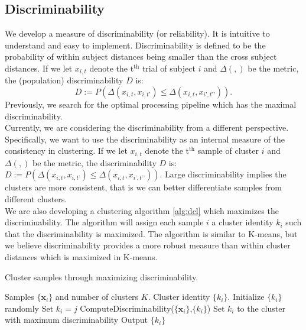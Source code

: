 \documentclass[simplex.tex]{subfiles}
\providecommand{\mb}[1]{\boldsymbol{#1}}
\newcommand{\bx}{\mb{x}}
\begin{document}
\subsection{Discriminability}
We develop a measure of discriminability (or reliability).  It
is intuitive to understand and easy to implement.
Discriminability is defined to be the probability of within
subject distances being smaller than the cross subject
distances. If we let $x_{i,t}$ denote the t$^{\text{th}}$ trial of subject 
$i$ and $\Delta(,)$ be the metric, the (population) discriminability $D$
is: 
\[D:= P (\Delta(x_{i,t} , x_{i,t’}) \leq  \Delta(x_{i,t} , x_{i’,t’’})).\]
Previously, we search for the optimal processing pipeline which has the
maximal discriminability. 
\\
Currently, we are considering the discriminability from a different perspective. Specifically, we want to use the discriminability as an internal measure of the consistency in clustering. If we let $x_{i,t}$ denote the t$^{\text{th}}$ sample of cluster 
$i$ and $\Delta(,)$ be the metric, the discriminability $D$
is: $D:= P (\Delta(x_{i,t} , x_{i,t’}) \leq  \Delta(x_{i,t} , x_{i’,t’’}))$. Large discriminability implies the clusters are more consistent, that is we can better differentiate samples from different clusters. 
\\
We are also developing a clustering algorithm \ref{alg:dcl} which maximizes the discriminability. The algorithm will assign each sample $i$ a cluster identity $k_i$ such that the discriminability is maximized. The algorithm is similar to K-means, but we believe discriminability provides a more robust measure than within cluster distances which is maximized in K-means.
\begin{algorithm}               
	\caption{Cluster samples through maximizing discriminability.  }   
	\label{alg:dcl}                       
	\begin{algorithmic}                    
		\Require Samples $\{\bx_{i}\}$ and number of clusters $K$.
		\Ensure Cluster identity $\{k_{i}\}$. 
		\State Initialize $\{k_{i}\}$ randomly
		\State Set $k_{i} = j$ 
		\State ComputeDiscriminability($\{\bx_{i}\}$,$\{k_{i}\}$)
		\EndFor
		\State Set $k_{i}$ to the cluster with maximum discriminability
		\EndFor 
		\EndWhile
		\State Output $\{k_{i}\}$ 
		\EndFunction
	\end{algorithmic}
\end{algorithm}
\end{document}
